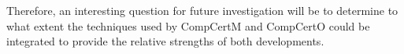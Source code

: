 \documentclass[sigplan,10pt,review,anonymous]{acmart}\settopmatter{printfolios=true,printccs=false,printacmref=false}
\begin{document}
Therefore,
an interesting question for future investigation
will be to determine to what extent
the techniques used by CompCertM and CompCertO
could be integrated to provide
the relative strengths of both developments.






\end{document}

